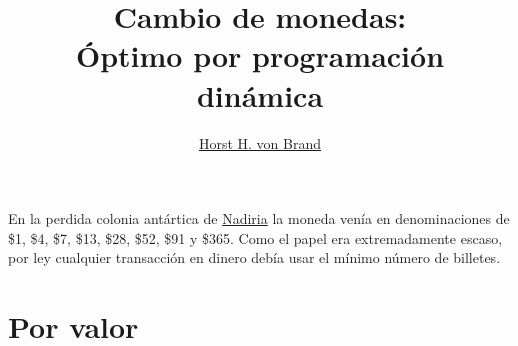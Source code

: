 \documentclass[english, spanish, fleqn]{article}
\title{Cambio de monedas:\\
       Óptimo por programación dinámica}
\author{\href{mailto:vonbrand@inf.utfsm.cl}{Horst H. von Brand}}
\begin{document}


\maketitle
\thispagestyle{empty}

  En la perdida colonia antártica
  de \href{http://moneyart.biz/dd}{Nadiria}
  la moneda venía en denominaciones
  de \$1, \$4, \$7, \$13, \$28, \$52, \$91 y \$365.
  Como el papel era extremadamente escaso,
  por ley cualquier transacción en dinero
  debía usar el mínimo número de billetes.

\section{Por valor}
\label{sec:by-value}
\end{document}
